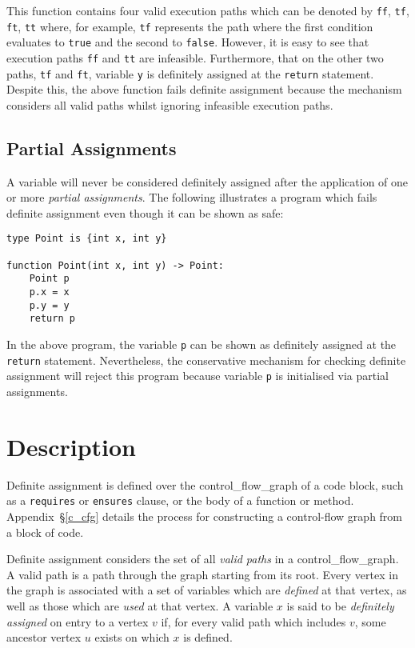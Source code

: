 This function contains four valid execution paths which can be denoted by \lstinline{ff}, \lstinline{tf}, \lstinline{ft}, \lstinline{tt} where, for example, \lstinline{tf} represents the path where the first condition evaluates to \lstinline{true} and the second to \lstinline{false}.  However, it is easy to see that execution paths \lstinline{ff} and \lstinline{tt} are infeasible.  Furthermore, that on the other two paths, \lstinline{tf} and \lstinline{ft}, variable \lstinline{y} is definitely assigned at the \lstinline{return} statement.  Despite this, the above function fails definite assignment because the mechanism considers all valid paths whilst ignoring infeasible execution paths.

\subsection{Partial Assignments}

A variable will never be considered definitely assigned after the application of one or more {\em partial assignments}.  The following illustrates a program which fails definite assignment even though it can be shown as safe:

\begin{lstlisting}
type Point is {int x, int y}

function Point(int x, int y) -> Point:
    Point p
    p.x = x
    p.y = y
    return p
\end{lstlisting}

In the above program, the variable \lstinline{p} can be shown as definitely assigned at the \lstinline{return} statement.  Nevertheless, the conservative mechanism for checking definite assignment will reject this program because variable \lstinline{p} is initialised via partial assignments.  

\section{Description}

Definite assignment is defined over the \gls{control_flow_graph} of a code block, such as a \lstinline{requires} or \lstinline{ensures} clause, or the body of a function or method.  Appendix~\S\ref{c_cfg} details the process for constructing a control-flow graph from a block of code.  

Definite assignment considers the set of all {\em valid paths} in a \gls{control_flow_graph}.  A valid path is a path through the graph starting from its root.  Every vertex in the graph is associated with a set of variables which are {\em defined} at that vertex, as well as those which are {\em used} at that vertex.  A variable $x$ is said to be {\em definitely assigned} on entry to a vertex $v$ if, for every valid path which includes $v$, some ancestor vertex $u$ exists on which $x$ is defined.

